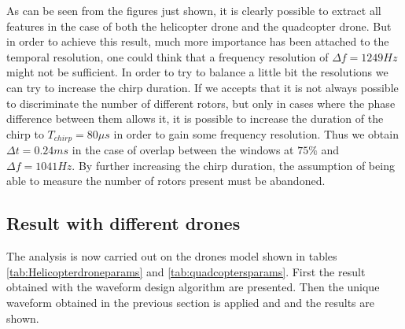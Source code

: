 As can be seen from the figures just shown, it is clearly possible to extract all features in the case of both the helicopter drone and the quadcopter drone. But in order to achieve this result, much more importance has been attached to the temporal resolution, one could think that a frequency resolution of $\Delta f = 1249 Hz$ might not be sufficient. In order to try to balance a little bit the resolutions we can try to increase the chirp duration. If we accepts that it is not always possible to discriminate the number of different rotors, but only in cases where the phase difference between them allows it, it is possible to increase the duration of the chirp to $T_{chirp} = 80 \mu s$ in order to gain some frequency resolution. Thus we obtain $\Delta t = 0.24 ms$ in the case of overlap between the windows at $75\%$ and $\Delta f = 1041 Hz$. By further increasing the chirp duration, the assumption of being able to measure the number of rotors present must be abandoned.

\subsection{Result with different drones}

The analysis is now carried out on the drones model shown in tables  \ref{tab:Helicopterdroneparams} and \ref{tab:quadcoptersparams}.
First the result obtained with the waveform design algorithm are presented. Then the unique waveform obtained in the previous section is applied and and the results are shown.

